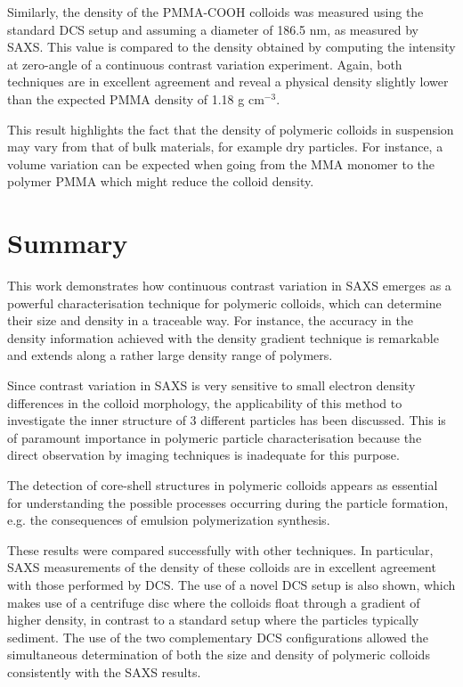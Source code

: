 Similarly, the density of the PMMA-COOH colloids was measured using the standard DCS setup and assuming a diameter of 186.5 nm, as measured by SAXS. This value is compared to the density obtained by computing the intensity at zero-angle of a continuous contrast variation experiment. Again, both techniques are in excellent agreement and reveal a physical density slightly lower than the expected PMMA density of 1.18 g cm$^{-3}$\citep{dingenouts_analysis_1999}.

This result highlights the fact that the density of polymeric colloids in suspension may vary from that of bulk materials, for example dry particles. For instance, a volume variation can be expected when going from the MMA monomer to the polymer PMMA\citep{nichols_prediction_1950} which might reduce the colloid density.
\section{Summary}
This work demonstrates how continuous contrast variation in SAXS emerges as a powerful characterisation technique for polymeric colloids, which can determine their size and density in a traceable way. For instance, the accuracy in the density information achieved with the density gradient technique is remarkable and extends along a rather large density range of polymers.

Since contrast variation in SAXS is very sensitive to small electron density differences in the colloid morphology, the applicability of this method to investigate the inner structure of 3 different particles has been discussed. This is of paramount importance in polymeric particle characterisation because the direct observation by imaging techniques is inadequate for this purpose.

The detection of core-shell structures in polymeric colloids appears as essential for understanding the possible processes occurring during the particle formation, e.g. the consequences of emulsion polymerization synthesis. 

These results were compared successfully with other techniques. In particular, SAXS measurements of the density of these colloids are in excellent agreement with those performed by DCS. The use of a novel DCS setup is also shown, which makes use of a centrifuge disc where the colloids float through a gradient of higher density, in contrast to a standard setup where the particles typically sediment. The use of the two complementary DCS configurations allowed the simultaneous determination of both the size and density of polymeric colloids consistently with the SAXS results.

